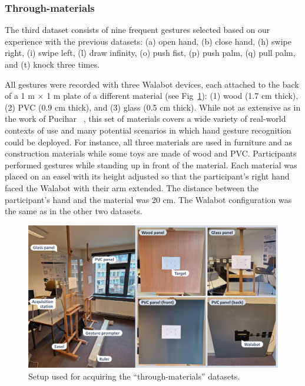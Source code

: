 \subsubsection{Through-materials} \label{sec:radar-experiments:data-collection:datasets:through-materials}
The third dataset consists of nine frequent gestures selected based on our experience with the previous datasets: (a) open hand, (b) close hand, (h) swipe right, (i) swipe left, (l) draw infinity, (o) push fist, (p) push palm, (q) pull palm, and (t) knock three times. 

All gestures were recorded with three Walabot devices, each attached to the back of a 1 m $\times$ 1 m plate of a different material (see Fig~\ref{fig:radar-experiments:setup-walabot-materials}): (1) wood (1.7 cm thick), (2) PVC (0.9 cm thick), and (3) glass (0.5 cm thick).
While not as extensive as in the work of Pucihar \etal~\cite{Pucihar:2022}, this set of materials covers a wide variety of real-world contexts of use and many potential scenarios in which hand gesture recognition could be deployed. For instance, all three materials are used in furniture and as construction materials while some toys are made of wood and PVC. 
Participants performed gestures while standing up in front of the material.
Each material was placed on an easel with its height adjusted so that the participant's right hand faced the Walabot with their arm extended. The distance between the participant's hand and the material was 20 cm. The Walabot configuration was the same as in the other two datasets.

\begin{figure}[t]
    \centering
    \includegraphics[width=\linewidth]{Figures/RadarExperiments/Datasets/ThroughMaterials/setup-walabot-materials.pdf}
    \vspace{-12pt}
    \caption{Setup used for acquiring the ``through-materials'' datasets.}
    \label{fig:radar-experiments:setup-walabot-materials}
\end{figure}

